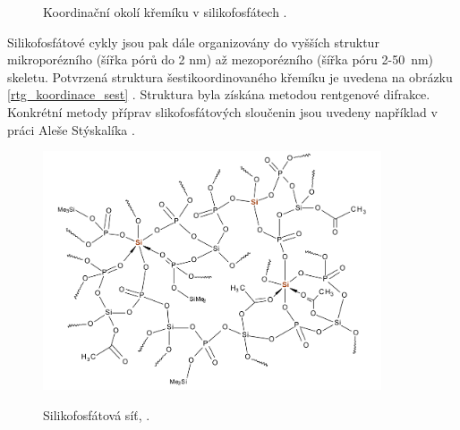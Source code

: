 \documentclass[
  digital, %
  table,   %
  lof,     %
  lot,     %
  oneside,
]{fithesis3}
\begin{document}
\begin{figure}
\begin{center}
  \label{koordinacni_okolo}
  \end{center}
  \caption{Koordinační okolí křemíku v silikofosfátech \cite{C4TA06823H}.}
\end{figure}
Silikofosfátové cykly jsou pak dále organizovány do vyšších struktur mikroporézního (šířka pórů do 2 nm) až mezoporézního (šířka póru 2-50~nm) skeletu. Potvrzená struktura šestikoordinovaného křemíku je uvedena na obrázku \ref{rtg_koordinace_sest} \cite{C3NJ00721A}. Struktura byla získána metodou rentgenové difrakce. Konkrétní metody příprav slikofosfátových sloučenin jsou uvedeny například v práci Aleše Stýskalíka \cite{Styskalik2015thesis}.

\begin{figure}
\caption{Silikofosfátová síť, \cite{Styskalik2015thesis}.}\includegraphics[width=10cm]{si_polymer_cely.png}
\label{si_polymer_cely}\end{figure}
\end{document}
